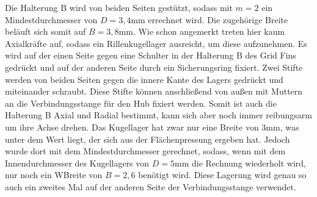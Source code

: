 Die Halterung B wird von beiden Seiten gestützt, sodass mit $m = 2$ ein Mindestdurchmesser von $D = 3,4$mm errechnet wird. Die zugehörige Breite beläuft sich somit auf $B = 3,8$mm. Wie schon angemerkt treten hier kaum Axialkräfte auf, sodass ein Rillenkugellager ausreicht, um diese aufzunehmen. Es wird auf der einen Seite gegen eine Schulter in der Halterung B des Grid Fins gedrückt und auf der anderen Seite durch ein Sicherungsring fixiert. Zwei Stifte werden von beiden Seiten gegen die innere Kante des Lagers gedrückt und miteinander schraubt. Diese Stifte können anschließend von außen mit Muttern an die Verbindungsstange für den Hub fixiert werden. Somit ist auch die Halterung B Axial und Radial bestimmt, kann sich aber noch immer reibungsarm um ihre Achse drehen. Das Kugellager hat zwar nur eine Breite von 3mm, was unter dem Wert liegt, der sich aus der Flächenpressung ergeben hat. Jedoch wurde dort mit dem Mindestdurchmesser gerechnet, sodass, wenn mit dem Innendurchmesser des Kugellagers von $D = 5$mm die Rechnung wiederholt wird, nur noch ein WBreite von $B =2,6$ benötigt wird. Diese Lagerung wird genau so auch ein zweites Mal auf der anderen Seite der Verbindungsstange verwendet.




